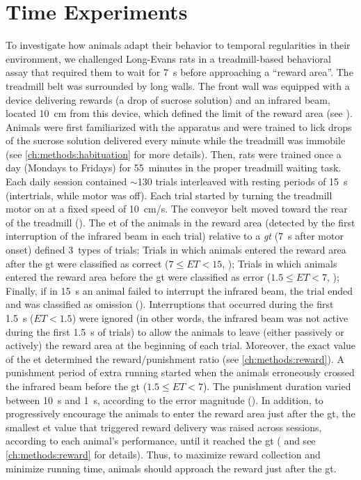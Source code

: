 \chapter{Time Experiments} \label{ch:time}

To investigate how animals adapt their behavior to temporal regularities in their environment, we challenged Long-Evans rats in a treadmill-based behavioral assay that required them to wait for 7~s before approaching a ``reward area''.\footnotemark
{}
The treadmill belt was surrounded by long walls.
The front wall was equipped with a device delivering rewards (a drop of sucrose solution) and an infrared beam, located 10~cm from this device, which defined the limit of the reward area (see ).
Animals were first familiarized with the apparatus and were trained to lick drops of the sucrose solution delivered every minute while the treadmill was immobile (see \autoref{ch:methods:habituation} for more details).
Then, rats were trained once a day (Mondays to Fridays) for 55~minutes in the proper treadmill waiting task.
Each daily session contained $\sim$130 trials interleaved with resting periods of 15~s (intertrials, while motor was off).
Each trial started by turning the treadmill motor on at a fixed speed of 10~cm/s.
The conveyor belt moved toward the rear of the treadmill ().
The \gls{et} of the animals in the reward area (detected by the first interruption of the infrared beam in each trial) relative to a \emph{\gls{gt}} (7~s after motor onset) defined 3~types of trials:
    Trials in which animals entered the reward area after the \gls{gt} were classified as correct ($7\leq ET<15$, );
    Trials in which animals entered the reward area before the \gls{gt} were classified as error ($1.5\leq ET<7$, );
    Finally, if in 15~s an animal failed to interrupt the infrared beam, the trial ended and was classified as omission ().
Interruptions that occurred during the first 1.5~s ($ET<1.5$) were ignored (in other words, the infrared beam was not active during the first 1.5~s of trials) to allow the animals to leave (either passively or actively) the reward area at the beginning of each trial.
Moreover, the exact value of the \gls{et} determined the reward/punishment ratio (see \autoref{ch:methods:reward}).
A punishment period of extra running started when the animals erroneously crossed the infrared beam before the \gls{gt} ($1.5\leq ET<7$).
The punishment duration varied between 10~s and 1~s, according to the error magnitude ().
In addition, to progressively encourage the animals to enter the reward area just after the \gls{gt}, the smallest \gls{et} value that triggered reward delivery was raised across sessions, according to each animal's performance, until it reached the \gls{gt} ( and see \autoref{ch:methods:reward} for details).
Thus, to maximize reward collection and minimize running time, animals should approach the reward just after the \gls{gt}.

